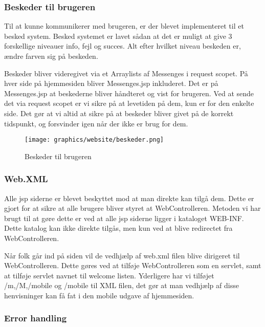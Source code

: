 \documentclass[a4paper]{article}
\begin{document}

\subsubsection{Beskeder til brugeren} %

Til at kunne kommunikerer med brugeren, er der blevet implementeret til et besked system. Besked systemet er lavet sådan at det er muligt at give 3 forskellige niveauer info, fejl og succes. Alt efter hvilket niveau beskeden er, ændre farven sig på beskeden. 

Beskeder bliver videregivet via et Arraylists af Messenges i request scopet. På hver side på hjemmesiden bliver Messenges.jsp inkluderet. Det er på Messenges.jsp at beskederne bliver håndteret og vist for brugeren. Ved at sende det via request scopet er vi sikre på at levetiden på dem, kun er for den enkelte side. Det gør at vi altid at sikre på at beskeder bliver givet på de korrekt tidspunkt, og forsvinder igen når der ikke er brug for dem.

\begin{figure}[H]
  \centering
  \texttt{[image: graphics/website/beskeder.png]}
  \caption{Beskeder til brugeren}
\end{figure}



\subsubsection{Web.XML} %

Alle jsp siderne er blevet beskyttet mod at man direkte kan tilgå dem. Dette er gjort for at sikre at alle brugere bliver styret at WebControlleren. Metoden vi har brugt til at gøre dette er ved at alle jsp siderne ligger i kataloget WEB-INF. Dette katalog kan ikke direkte tilgås, men kun ved at blive redirectet fra WebControlleren. 

Når folk går ind på siden vil de vedhjælp af web.xml filen blive dirigeret til WebControlleren. Dette gøres ved at tilføje WebControlleren som en servlet, samt at tilføje servlet navnet til welcome listen. Yderligere har vi tilføjet /m,/M,/mobile og /mobile til XML filen, det gør at man vedhjælp af disse henvisninger kan få fat i den mobile udgave af hjemmesiden.


\subsubsection{Error handling} %
\end{document}
